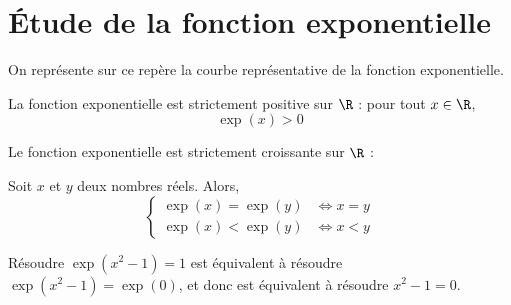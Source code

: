 \documentclass{article}
\begin{document}
\section{Étude de la fonction exponentielle}
On représente sur ce repère la courbe représentative de la fonction exponentielle.
\begin{center}
\end{center}
\begin{tcolorbox}
\begin{proposition}
La fonction exponentielle est strictement positive sur $\R$ : pour tout $x \in \R$,
\begin{equation*}
\exp(x) > 0
\end{equation*}
\end{proposition}
\end{tcolorbox}
\begin{tcolorbox}
\begin{proposition}
Le fonction exponentielle est strictement croissante sur $\R$ :
\begin{center}
\end{center}
\end{proposition}
\end{tcolorbox}
\begin{proposition}
Soit $x$ et $y$ deux nombres réels. Alors,
\begin{equation*}
\begin{cases}
\exp(x) = \exp(y) &\Leftrightarrow x = y\\
\exp(x) < \exp(y) &\Leftrightarrow x < y
\end{cases}
\end{equation*}
\end{proposition}
\begin{example}
Résoudre $\exp(x^2-1) = 1$ est équivalent à résoudre $\exp(x^2-1) = \exp(0)$, et donc est équivalent à résoudre $x^2 - 1 = 0$.
\end{example}
\end{document}
